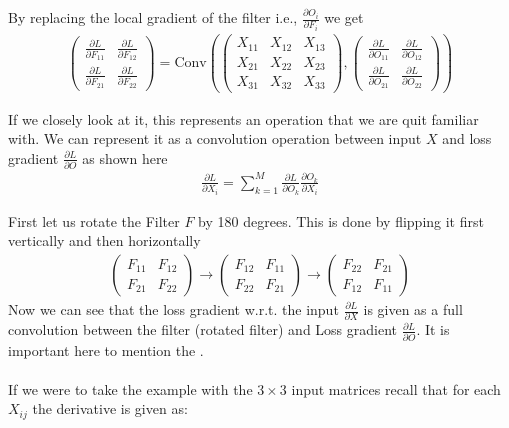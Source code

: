 By replacing the local gradient of the filter i.e., $\frac{\partial O_i}{\partial F_i} $ we get 
\begin{align*} 
	\begin{pmatrix} \frac{\partial L}{\partial F_{11}}  &  \frac{\partial L}{\partial F_{12}} \\  \frac{\partial L}{\partial F_{21}} &  \frac{\partial L}{\partial F_{22}} \end{pmatrix} =  \text{Conv} \left(\begin{pmatrix} X_{11} & X_{12} & X_{13} \\ X_{21} & X_{22} & X_{23} \\ X_{31} & X_{32} & X_{33} \end{pmatrix}, \begin{pmatrix} \frac{\partial L}{\partial O_{11}}  &\frac{\partial L}{\partial O_{12}}  \\\frac{\partial L}{\partial O_{21}}  & \frac{\partial L}{\partial O_{22}} \end{pmatrix} \right)
\end{align*}

If we closely look at it, this represents an operation that we are quit familiar with. We can represent it as a convolution operation between input $X$ and loss gradient $\frac{\partial L}{\partial O} $ as shown here 
\begin{align*} 
	\frac{\partial L}{\partial X_i}  =  \sum_{k= 1}^{M} \frac{\partial L}{\partial O_k}  \frac{\partial O_k}{\partial X_i} 
\end{align*}

First let us rotate the Filter $F$ by 180 degrees. This is done by flipping it first vertically and then horizontally 
\begin{align*} 
	\begin{pmatrix} F_{11} & F_{12} \\ F_{21} & F_{22} \end{pmatrix}  \to \begin{pmatrix} F_{12} & F_{11} \\ F_{22} & F_{21} \end{pmatrix}  \to \begin{pmatrix} F_{22} & F_{21} \\ F_{12} & F_{11} \end{pmatrix} 
\end{align*}
Now we can see that the loss gradient w.r.t. the input $\frac{\partial L}{\partial X} $ is given as a full convolution between the filter (rotated filter) and Loss gradient $\frac{\partial L}{\partial O} $. It is important here to mention the .\\
$ $\\
If we were to take the example with the $3 \times 3$ input matrices recall that for each $X_{ij}$ the derivative is given as: 

